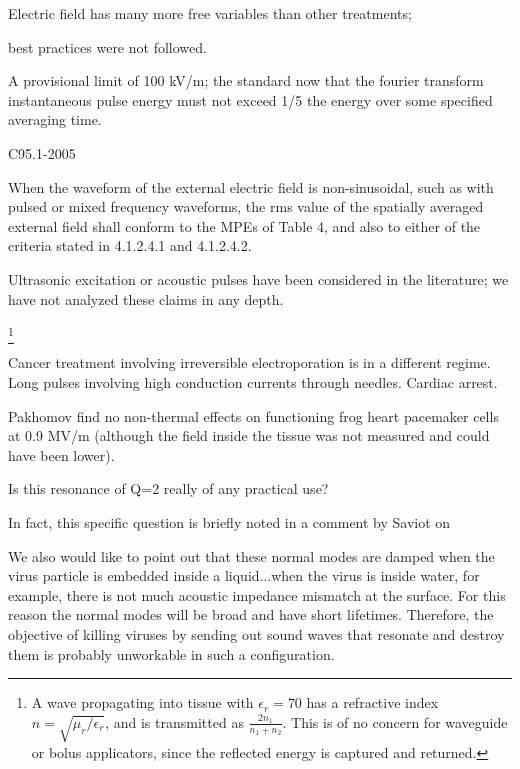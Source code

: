 \documentclass[paper.tex]{subfiles}
\begin{document}
\begin{multicols}{1}
Electric field has many more free variables than other treatments; 



best practices were not followed.





A provisional limit of 100 kV/m; the standard now that the fourier transform instantaneous pulse energy must not exceed 1/5 the energy over some specified averaging time.

C95.1-2005


When the waveform of the external electric field is non-sinusoidal, such as with pulsed or mixed frequency
waveforms, the rms value of the spatially averaged external field shall conform to the MPEs of Table 4, and
also to either of the criteria stated in 4.1.2.4.1 and 4.1.2.4.2.

 
Ultrasonic excitation or acoustic pulses have been considered in the literature; we have not analyzed these claims in any depth.







\footnote{A wave propagating into tissue with $\epsilon_r=70$ has a refractive index $n=\sqrt{\mu_r/\epsilon_r}$, and is transmitted as $\frac{2 n_1}{n_1 + n_2}$. This is of no concern for waveguide or bolus applicators, since the reflected energy is captured and returned.}






Cancer treatment involving irreversible electroporation is in a different regime. Long pulses involving high conduction currents through needles. Cardiac arrest.



Pakhomov \cite{Comparative} find no non-thermal effects on functioning frog heart pacemaker cells at 0.9 MV/m (although the field inside the tissue was not measured and could have been lower). 



Is this resonance of Q=2 really of any practical use?


In fact, this specific question is briefly noted in a comment by Saviot \cite{Comment2004} on 


\begin{fquote}
	We also would like to point out that these normal modes are damped when the virus particle is embedded inside a liquid...when the virus is inside water, for example, there is not much acoustic impedance mismatch at the surface. For this reason the normal modes will be broad and have short lifetimes. Therefore, the objective of killing viruses by sending out sound waves that resonate and destroy them is probably unworkable in such a configuration.	
\end{fquote}





\end{multicols}
\end{document}
